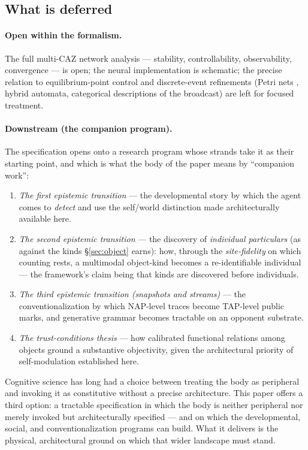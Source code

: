 \documentclass{article}
\begin{document}
\subsection*{What is deferred}

\paragraph{Open within the formalism.}
The full multi-CAZ network analysis --- stability, controllability,
observability, convergence --- is open; the neural implementation is
schematic; the precise relation to equilibrium-point control
\citep{Feldman1986_EquilibriumPoint} and discrete-event refinements
(Petri nets \citep{peterson1977petri}, hybrid automata, categorical
descriptions of the broadcast) are left for focused treatment.

\paragraph{Downstream (the companion program).}\label{sec:roadmap}
The specification opens onto a research program whose strands take it as
their starting point, and which is what the body of the paper means by
``companion work'':
\begin{enumerate}[itemsep=2pt,leftmargin=2em]
\item \emph{The first epistemic transition} --- the developmental story by
which the agent comes to \emph{detect} and use the self/world distinction
made architecturally available here.
\item \emph{The second epistemic transition} --- the discovery of
\emph{individual particulars} (as against the kinds \S\ref{sec:object}
earns): how, through the \emph{site-fidelity} on which counting rests, a
multimodal object-kind becomes a re-identifiable individual --- the
framework's claim being that kinds are discovered before individuals.
\item \emph{The third epistemic transition (snapshots and streams)} ---
the conventionalization by which NAP-level traces become TAP-level public
marks, and generative grammar becomes tractable on an opponent substrate.
\item \emph{The trust-conditions thesis} --- how calibrated functional
relations among objects ground a substantive objectivity, given the
architectural priority of self-modulation established here.
\end{enumerate}

Cognitive science has long had a choice between treating the body as
peripheral and invoking it as constitutive without a precise
architecture.  This paper offers a third option: a tractable
specification in which the body is neither peripheral nor merely invoked
but architecturally specified --- and on which the developmental, social,
and conventionalization programs can build.  What it delivers is the
physical, architectural ground on which that wider landscape must stand.
\end{document}
